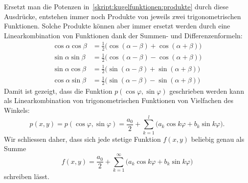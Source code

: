 Ersetzt man die Potenzen in~\eqref{skript:kugelfunktionen:produkte}
durch diese Ausdrücke, entstehen immer noch Produkte von jeweils
zwei trigonometrischen Funktionen.
Solche Produkte können aber immer ersetzt werden durch eine
Linearkombination von Funktionen dank der Summen- und Differenzenformeln:
\begin{align*}
\cos\alpha\cos\beta
&=
\frac12\bigl(\cos(\alpha-\beta)+\cos(\alpha+\beta)\bigr)
\\
\sin\alpha\sin\beta
&=
\frac12\bigl(\cos(\alpha-\beta)-\cos(\alpha+\beta)\bigr)
\\
\sin\alpha\cos\beta
&=
\frac12\bigl(\sin(\alpha-\beta)+\sin(\alpha+\beta)\bigr)
\\
\cos\alpha\sin\beta
&=
\frac12\bigl(\sin(\alpha-\beta)-\sin(\alpha+\beta)\bigr)
\end{align*}
Damit ist gezeigt, dass die Funktion $p(\cos\varphi,\sin\varphi)$
geschrieben werden kann als Linearkombination von trigonometrischen
Funktionen von Vielfachen des Winkels:
\[
p(x,y)=p(\cos\varphi,\sin\varphi)
=
\frac{a_0}2
+
\sum_{k=1}^l \bigl(
a_k\cos k\varphi+b_k\sin k\varphi
\bigr).
\]
Wir schliessen daher, dass sich jede stetige Funktion $f(x,y)$ 
beliebig genau als Summe
\begin{equation}
f(x,y)
=
\frac{a_0}2
+
\sum_{k=1}^\infty \bigl(
a_k\cos k\varphi+b_k\sin k\varphi
\bigr)
\label{skript:kugelfunktionen:fourierreihe}
\end{equation}
schreiben lässt.

